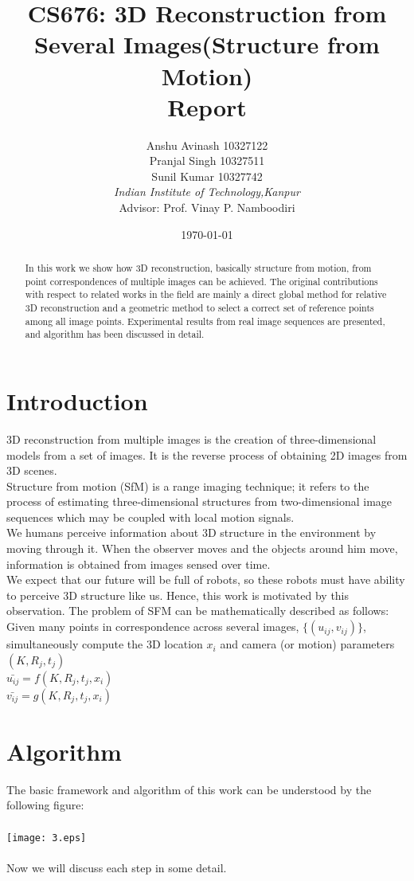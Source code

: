 \documentclass{article}
\title{\textbf{CS676: 3D Reconstruction from Several Images(Structure from Motion)\\} Report}
\author{\normalsize Anshu Avinash 10327122 \\ \normalsize Pranjal Singh 10327511\\ \normalsize Sunil Kumar 10327742\\
\emph{Indian Institute of Technology,Kanpur}\\ Advisor: Prof. Vinay P. Namboodiri}
\date{\today}
\begin{document}
\maketitle
\begin{abstract}
In this work we show how 3D reconstruction, basically structure from motion, from point correspondences of multiple images can be achieved. The original contributions with respect to related works in the field are mainly a direct global method for relative 3D reconstruction and a geometric method to select a correct set of reference points among all image points. Experimental results from real image sequences are presented, and algorithm has been discussed in detail.
\end{abstract}

\section{Introduction}
3D reconstruction from multiple images is the creation of three-dimensional models from a set of images. It is the reverse process of obtaining 2D images from 3D scenes.\\
Structure from motion (SfM) is a range imaging technique; it refers to the process of estimating three-dimensional structures from two-dimensional image sequences which may be coupled with local motion signals.\\
We humans perceive information about 3D structure in the environment by moving through it. When the observer moves and the objects around him move, information is obtained from images sensed over time.\\
We expect that our future will be full of robots, so these robots must have ability to perceive 3D structure like us. Hence, this work is motivated by this observation. The problem of SFM can be mathematically described as follows:\\
Given many points in correspondence across several images, $\{(u_{ij},v_{ij})\}$, simultaneously compute the 3D location $x_i$ and camera (or motion) parameters $(K,R_j,t_j)$\\
$\bar{u_{ij}}=f(K,R_j,t_j,x_i)$\\
$\bar{v_{ij}}=g(K,R_j,t_j,x_i)$

\section{Algorithm}
The basic framework and algorithm of this work can be understood by the following figure:\\\\
\texttt{[image: 3.eps]}\\\\
Now we will discuss each step in some detail.
\end{document}
